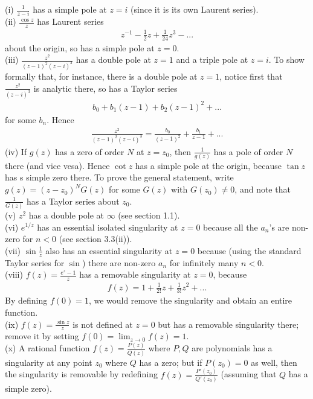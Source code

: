 \documentclass[a4paper]{article}
\begin{document}
\begin{eg}
(i) $\frac{1}{z-i}$ has a simple pole at $z=i$ (since it is its own Laurent series).\\
(ii) $\frac{\cos z}{z}$ has Laurent series
\begin{equation*}
\begin{aligned}
z^{-1} - \frac{1}{2}z + \frac{1}{24}z^3 - ...
\end{aligned}
\end{equation*}
about the origin, so has a simple pole at $z=0$.\\
(iii) $\frac{z^2}{(z-1)^2(z-i)^3}$ has a double pole at $z=1$ and a triple pole at $z=i$. To show formally that, for instance, there is a double pole at $z=1$, notice first that $\frac{z^2}{(z-i)^3}$ is analytic there, so has a Taylor series
\begin{equation*}
\begin{aligned}
b_0+b_1(z-1)+b_2(z-1)^2+...
\end{aligned}
\end{equation*}
for some $b_n$. Hence
\begin{equation*}
\begin{aligned}
\frac{z^2}{(z-1)^2(z-i)^3} = \frac{b_0}{(z-1)^2} + \frac{b_1}{z-1} + ...
\end{aligned}
\end{equation*}
(iv) If $g(z)$ has a zero of order $N$ at $z=z_0$, then $\frac{1}{g(z)}$ has a pole of order $N$ there (and vice vesa). Hence $\cot z$ has a simple pole at the origin, because $\tan z$ has s simple zero there. To prove the general statement, write $g(z) = (z-z_0)^N G(z)$ for some $G(z)$ with $G(z_0) \neq 0$, and note that $\frac{1}{G(z)}$ has a Taylor series about $z_0$.\\
(v) $z^2$ has a double pole at $\infty$ (see section 1.1).\\
(vi) $e^{1/z}$ has an essential isolated singularity at $z=0$ because all the $a_n$'s are non-zero for $n<0$ (see section 3.3(ii)).\\
(vii) $\sin \frac{1}{z}$ also has an essential singularity at $z=0$ because (using the standard Taylor series for $\sin$) there are non-zero $a_n$ for infinitely many $n<0$.\\
(viii) $f(z) = \frac{e^z-1}{z}$ has a removable singularity at $z=0$, because
\begin{equation*}
\begin{aligned}
f(z)= 1+\frac{1}{2!}z + \frac{1}{3!} z^2 + ...
\end{aligned}
\end{equation*}
By defining $f(0)=1$, we would remove the singularity and obtain an entire function.\\
(ix) $f(z) = \frac{\sin z}{z}$ is not defined at $z=0$ but has a removable singularity there; remove it by setting $f(0) = \lim_{z \to 0} f(z) = 1$.\\
(x) A rational function $f(z) = \frac{P(z)}{Q(z)}$ where $P,Q$ are polynomials has a singularity at any point $z_0$ where $Q$ has a zero; but if $P(z_0)=0$ as well, then the singularity is removable by redefining $f(z) = \frac{P'(z_0)}{Q'(z_0)}$ (assuming that $Q$ has a simple zero).
\end{eg}
\end{document}
